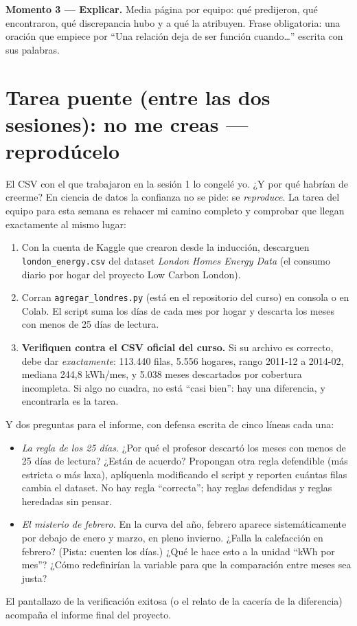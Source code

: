 \documentclass[12pt,letterpaper]{article}
\begin{document}
\begin{enumerate}[label=\arabic*.]
\end{enumerate}

\textbf{Momento 3 --- Explicar.} Media página por equipo: qué predijeron, qué encontraron, qué discrepancia hubo y a qué la atribuyen. Frase obligatoria: una oración que empiece por ``Una relación deja de ser función cuando\ldots'' escrita con sus palabras.

\section{Tarea puente (entre las dos sesiones): no me creas --- reprodúcelo}
El CSV con el que trabajaron en la sesión 1 lo congelé yo. ¿Y por qué habrían de creerme? En ciencia de datos la confianza no se pide: se \emph{reproduce}. La tarea del equipo para esta semana es rehacer mi camino completo y comprobar que llegan exactamente al mismo lugar:
\begin{enumerate}[label=\arabic*., itemsep=0.15em]
    \item Con la cuenta de Kaggle que crearon desde la inducción, descarguen \texttt{london\_energy.csv} del dataset \emph{London Homes Energy Data} (el consumo diario por hogar del proyecto Low Carbon London).
    \item Corran \texttt{agregar\_londres.py} (está en el repositorio del curso) en consola o en Colab. El script suma los días de cada mes por hogar y descarta los meses con menos de 25 días de lectura.
    \item \textbf{Verifiquen contra el CSV oficial del curso.} Si su archivo es correcto, debe dar \emph{exactamente}: 113.440 filas, 5.556 hogares, rango 2011-12 a 2014-02, mediana 244,8 kWh/mes, y 5.038 meses descartados por cobertura incompleta. Si algo no cuadra, no está ``casi bien'': hay una diferencia, y encontrarla es la tarea.
\end{enumerate}
Y dos preguntas para el informe, con defensa escrita de cinco líneas cada una:
\begin{itemize}[itemsep=0.1em]
    \item \emph{La regla de los 25 días.} ¿Por qué el profesor descartó los meses con menos de 25 días de lectura? ¿Están de acuerdo? Propongan otra regla defendible (más estricta o más laxa), aplíquenla modificando el script y reporten cuántas filas cambia el dataset. No hay regla ``correcta''; hay reglas defendidas y reglas heredadas sin pensar.
    \item \emph{El misterio de febrero.} En la curva del año, febrero aparece sistemáticamente por debajo de enero y marzo, en pleno invierno. ¿Falla la calefacción en febrero? (Pista: cuenten los días.) ¿Qué le hace esto a la unidad ``kWh por mes''? ¿Cómo redefinirían la variable para que la comparación entre meses sea justa?
\end{itemize}
El pantallazo de la verificación exitosa (o el relato de la cacería de la diferencia) acompaña el informe final del proyecto.
\end{document}
